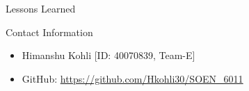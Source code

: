 \documentclass[final]{beamer}
\newlength{\sepwid}
\newlength{\onecolwid}
\begin{document}
\begin{frame}
\begin{columns}[t]
\begin{column}{\onecolwid}
\begin{exampleblock}{Lessons Learned}
\end{exampleblock}





\begin{block}{Contact Information}

\begin{itemize}
\item Himanshu Kohli [ID: 40070839, Team-E]
\item GitHub: \url{https://github.com/Hkohli30/SOEN_6011}
\end{itemize}

\end{block}

\end{column} %

\begin{column}{\sepwid}\end{column} %

\end{columns} %

\end{frame} %
\end{document}

